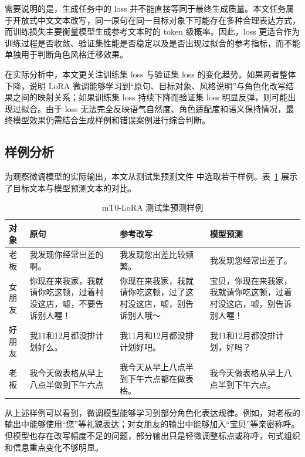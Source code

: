\documentclass[12pt,a4paper]{ctexart}
\begin{document}
需要说明的是，生成任务中的 loss 并不能直接等同于最终生成质量。本文任务属于开放式中文文本改写，同一原句在同一目标对象下可能存在多种合理表达方式，而训练损失主要衡量模型生成参考文本时的 token 级概率。因此，loss 更适合作为训练过程是否收敛、验证集性能是否稳定以及是否出现过拟合的参考指标，而不能单独用于判断角色风格迁移效果。

在实际分析中，本文更关注训练集 loss 与验证集 loss 的变化趋势。如果两者整体下降，说明 LoRA 微调能够学习到“原句、目标对象、风格说明”与角色化改写结果之间的映射关系；如果训练集 loss 持续下降而验证集 loss 明显反弹，则可能出现过拟合。由于 loss 无法完全反映语气自然度、角色适配度和语义保持情况，最终模型效果仍需结合生成样例和错误案例进行综合判断。

\subsection{样例分析}

为观察微调模型的实际输出，本文从测试集预测文件  中选取若干样例。表~\ref{tab:lora_prediction_examples} 展示了目标文本与模型预测文本的对比。

\begin{table}[H]
\centering
\caption{mT0-LoRA 测试集预测样例}
\label{tab:lora_prediction_examples}
\begin{tabular}{p{1.6cm}|p{3.4cm}|p{3.8cm}|p{3.8cm}}
\toprule
对象 & 原句 & 参考改写 & 模型预测 \\
\midrule
老板 & 我发现你经常出差的啊。 & 我发现您出差比较频繁。 & 我发现您经常出差了。 \\
女朋友 & 你现在来我家，我就请你吃这顿，过着村没这店，嘘，不要告诉别人喔！ & 你现在来我家，我就请你吃这顿，过了这村没这店，嘘，别告诉别人哦～ & 宝贝，你现在来我家，我就请你吃这顿，过着村没这店，嘘，别告诉别人喔！ \\
好朋友 & 我11和12月都没排计划好么。 & 我11月和12月都没排计划好吧。 & 我11和12月都没排计划，好吗？ \\
老板 & 我今天做表格从早上八点半做到下午六点 & 我今天从早上八点半到下午六点都在做表格。 & 我今天做表格从早上八点半到下午六点。 \\
\bottomrule
\end{tabular}
\end{table}

从上述样例可以看到，微调模型能够学习到部分角色化表达规律。例如，对老板的输出中能够使用“您”等礼貌表达；对女朋友的输出中能够加入“宝贝”等亲密称呼。但模型也存在改写幅度不足的问题，部分输出只是轻微调整标点或称呼，句式组织和信息重点变化不够明显。
\end{document}

